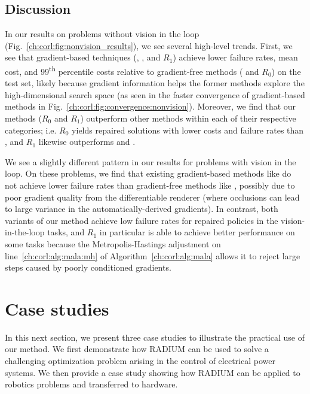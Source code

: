 \subsection{Discussion}

In our results on problems without vision in the loop (Fig.~\ref{ch:corl:fig:nonvision_results}), we see several high-level trends. First, we see that gradient-based techniques (\gdr, \gda, and $R_1$) achieve lower failure rates, mean cost, and 99\textsuperscript{th} percentile costs relative to gradient-free methods (\ltc{} and $R_0$) on the test set, likely because gradient information helps the former methods explore the high-dimensional search space (as seen in the faster convergence of gradient-based methods in Fig.~\ref{ch:corl:fig:convergence:nonvision}). Moreover, we find that our methods ($R_0$ and $R_1$) outperform other methods within each of their respective categories; i.e. $R_0$ yields repaired solutions with lower costs and failure rates than \ltc, and $R_1$ likewise outperforms \gdr{} and \gda{}.

We see a slightly different pattern in our results for problems with vision in the loop. On these problems, we find that existing gradient-based methods like \gda{} do not achieve lower failure rates than gradient-free methods like \ltc{}, possibly due to poor gradient quality from the differentiable renderer (where occlusions can lead to large variance in the automatically-derived gradients). In contrast, both variants of our method achieve low failure rates for repaired policies in the vision-in-the-loop tasks, and $R_1$ in particular is able to achieve better performance on some tasks because the Metropolis-Hastings adjustment on line~\ref{ch:corl:alg:mala:mh} of Algorithm~\ref{ch:corl:alg:mala} allows it to reject large steps caused by poorly conditioned gradients.

\section{Case studies}\label{ch:corl:case_studies}

In this next section, we present three case studies to illustrate the practical use of our method. We first demonstrate how RADIUM can be used to solve a challenging optimization problem arising in the control of electrical power systems. We then provide a case study showing how RADIUM can be applied to robotics problems and transferred to hardware.  %

